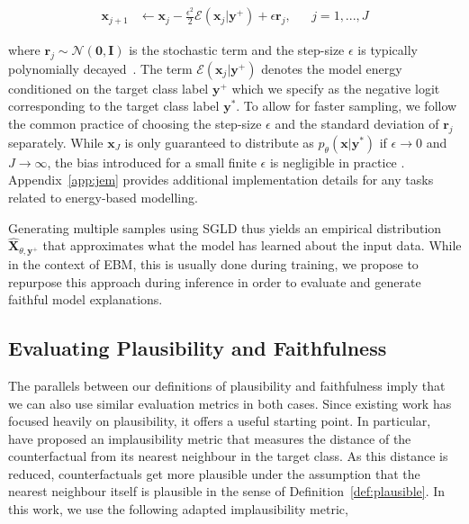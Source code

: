 \documentclass{article}
\begin{document}
\begin{equation}\label{eq:sgld}
  \begin{aligned}
    \mathbf{x}_{j+1} &\leftarrow \mathbf{x}_j - \frac{\epsilon^2}{2} \mathcal{E}(\mathbf{x}_j|\mathbf{y}^+) + \epsilon \mathbf{r}_j, && j=1,...,J
  \end{aligned}
\end{equation}

where $\mathbf{r}_j \sim \mathcal{N}(\mathbf{0},\mathbf{I})$ is the stochastic term and the step-size $\epsilon$ is typically polynomially decayed~\citep{welling2011bayesian}. The term $\mathcal{E}(\mathbf{x}_j|\mathbf{y}^+)$ denotes the model energy conditioned on the target class label $\mathbf{y}^+$ which we specify as the negative logit corresponding to the target class label $\mathbf{y}^*$. To allow for faster sampling, we follow the common practice of choosing the step-size $\epsilon$ and the standard deviation of $\mathbf{r}_j$ separately. While $\mathbf{x}_J$ is only guaranteed to distribute as $p_{\theta}(\mathbf{x}|\mathbf{y}^*)$ if $\epsilon \rightarrow 0$ and $J \rightarrow \infty$, the bias introduced for a small finite $\epsilon$ is negligible in practice \citep{murphy2023probabilistic,grathwohl2020your}. Appendix~\ref{app:jem} provides additional implementation details for any tasks related to energy-based modelling. 

Generating multiple samples using SGLD thus yields an empirical distribution $\hat{\mathbf{X}}_{\theta,\mathbf{y}^+}$ that approximates what the model has learned about the input data. While in the context of EBM, this is usually done during training, we propose to repurpose this approach during inference in order to evaluate and generate faithful model explanations.

\subsection{Evaluating Plausibility and Faithfulness}

The parallels between our definitions of plausibility and faithfulness imply that we can also use similar evaluation metrics in both cases. Since existing work has focused heavily on plausibility, it offers a useful starting point. In particular,~\citet{guidotti2022counterfactual} have proposed an implausibility metric that measures the distance of the counterfactual from its nearest neighbour in the target class. As this distance is reduced, counterfactuals get more plausible under the assumption that the nearest neighbour itself is plausible in the sense of Definition~\ref{def:plausible}. In this work, we use the following adapted implausibility metric,
\end{document}
